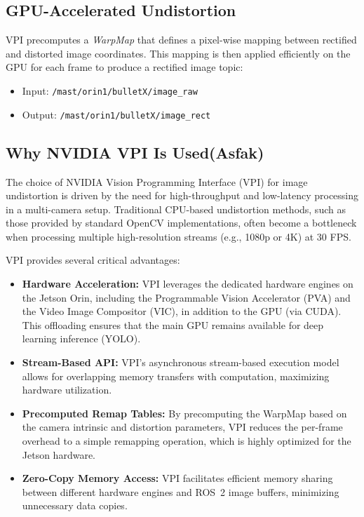 \documentclass[12pt,a4paper]{report}
\begin{document}
\subsection{GPU-Accelerated Undistortion}
VPI precomputes a \emph{WarpMap} that defines a pixel-wise mapping between rectified and distorted image coordinates. This mapping is then applied efficiently on the GPU for each frame to produce a rectified image topic:
\begin{itemize}
    \item Input: \texttt{/mast/orin1/bulletX/image\_raw}
    \item Output: \texttt{/mast/orin1/bulletX/image\_rect}
\end{itemize}

\subsection{Why NVIDIA VPI Is Used(Asfak)}
The choice of NVIDIA Vision Programming Interface (VPI) for image undistortion is driven by the need for high-throughput and low-latency processing in a multi-camera setup. Traditional CPU-based undistortion methods, such as those provided by standard OpenCV implementations, often become a bottleneck when processing multiple high-resolution streams (e.g., 1080p or 4K) at 30 FPS. 

VPI provides several critical advantages:
\begin{itemize}
    \item \textbf{Hardware Acceleration:} VPI leverages the dedicated hardware engines on the Jetson Orin, including the Programmable Vision Accelerator (PVA) and the Video Image Compositor (VIC), in addition to the GPU (via CUDA). This offloading ensures that the main GPU remains available for deep learning inference (YOLO).
    \item \textbf{Stream-Based API:} VPI's asynchronous stream-based execution model allows for overlapping memory transfers with computation, maximizing hardware utilization.
    \item \textbf{Precomputed Remap Tables:} By precomputing the WarpMap based on the camera intrinsic and distortion parameters, VPI reduces the per-frame overhead to a simple remapping operation, which is highly optimized for the Jetson hardware.
    \item \textbf{Zero-Copy Memory Access:} VPI facilitates efficient memory sharing between different hardware engines and ROS~2 image buffers, minimizing unnecessary data copies.
\end{itemize}
\end{document}
